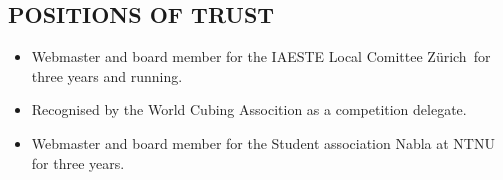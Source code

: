 \documentclass[line,margin]{res}
\newcommand{\zh}{Z\"{u}rich}
\begin{document}
\begin{resume}
\section{POSITIONS OF TRUST}
    \begin{itemize}
        \item Webmaster and board member for the IAESTE Local Comittee \zh\ for three years and running.
        \item Recognised by the World Cubing Assocition as a competition delegate.
        \item Webmaster and board member for the Student association Nabla at NTNU for three years.
    \end{itemize}


\end{resume}
\end{document}
